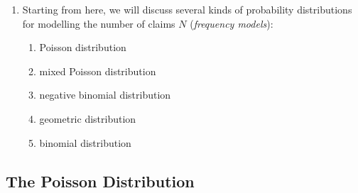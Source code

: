 \begin{enumerate}
\item Starting from here, we will discuss several kinds of probability
distributions for modelling the number of claims \(N\) (\emph{frequency
models}):
\begin{enumerate}
\item Poisson distribution
\item mixed Poisson distribution
\item negative binomial distribution
\item geometric distribution
\item binomial distribution
\end{enumerate}
\end{enumerate}
\subsection{The Poisson Distribution}
